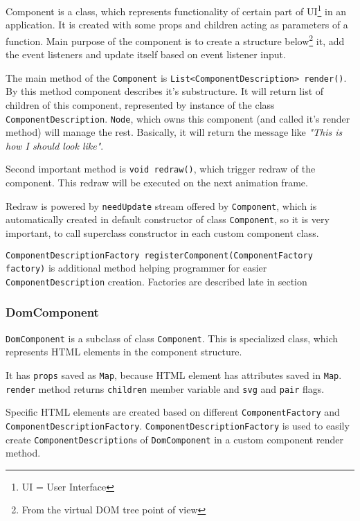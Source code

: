 \documentclass[oneside, 12pt]{book}
\begin{document}
      Component is a class, which represents functionality of certain part of UI\footnote{UI = User Interface} in an application.
      It is created with some props and children acting as parameters of a function. 
      Main purpose of the component is to create a structure below\footnote{From the virtual DOM tree point of view} it, 
      add the event listeners and update itself based on event listener input.

      The main method of the \texttt{Component} is \texttt{List<ComponentDescription> render()}. 
      By this method component describes it's substructure.
      It will return list of children of this component, represented by instance of the class \texttt{ComponentDescription}. 
      \texttt{Node}, which owns this component (and called it's render method) will manage the rest.
      Basically, it will return the message like \textit{"This is how I should look like"}.

      Second important method is \texttt{void redraw()}, which trigger redraw of the component. 
      This redraw will be executed on the next animation frame. 

      Redraw is powered by \texttt{needUpdate} stream offered by \texttt{Component}, 
      which is automatically created in default constructor of class \texttt{Component}, 
      so it is very important, to call superclass constructor in each custom component class.

			\texttt{ComponentDescriptionFactory registerComponent(ComponentFactory factory)} is additional method helping programmer 
			for easier \texttt{ComponentDescription} creation. 
			Factories are described late in section~
      
    \subsubsection{DomComponent}\label{subsubsec:our-architecture-core-dom-component}
      \texttt{DomComponent} is a subclass of class \texttt{Component}. 
      This is specialized class, which represents HTML elements in the component structure.

      It has \texttt{props} saved as \texttt{Map}, because HTML element has attributes saved in \texttt{Map}.
      \texttt{render} method returns \texttt{children} member variable and \texttt{svg} and \texttt{pair} flags.

      Specific HTML elements are created based on different \texttt{ComponentFactory} and \texttt{ComponentDescriptionFactory}.
      \texttt{ComponentDescriptionFactory} is used to easily create \texttt{ComponentDescription}s of \texttt{DomComponent} in a custom component render method. 
\end{document}
